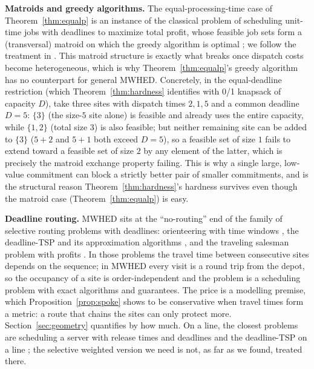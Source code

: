 \documentclass[pdflatex,sn-mathphys-ay]{sn-jnl}
\theoremstyle{thmstyleone}
\theoremstyle{thmstyletwo}
\theoremstyle{thmstylethree}
\begin{document}
\textbf{Matroids and greedy algorithms.} The equal-processing-time case
of Theorem~\ref{thm:equalp} is an instance of the classical problem of
scheduling unit-time jobs with deadlines to maximize total profit, whose
feasible job sets form a (transversal) matroid on which the greedy
algorithm is optimal \citep{edmonds1971}; we follow the treatment in
\citet{kortevygen2018}. This matroid structure is exactly what breaks
once dispatch costs become heterogeneous, which is why
Theorem~\ref{thm:equalp}'s greedy algorithm has no counterpart for
general MWHED. Concretely, in the equal-deadline restriction (which
Theorem~\ref{thm:hardness} identifies with 0/1 knapsack of capacity
$D$), take three sites with dispatch times $2,1,5$ and a common
deadline $D=5$: $\{3\}$ (the size-$5$ site alone) is feasible and
already uses the entire capacity, while $\{1,2\}$ (total size $3$) is
also feasible; but neither remaining site can be added to $\{3\}$ ($5+2$
and $5+1$ both exceed $D=5$), so a feasible set of size $1$ fails to
extend toward a feasible set of size $2$ by any element of the latter,
which is precisely the matroid exchange property failing. This is why a
single large, low-value commitment can block a strictly better pair of
smaller commitments, and is the structural reason
Theorem~\ref{thm:hardness}'s hardness survives even though the matroid
case (Theorem~\ref{thm:equalp}) is easy.

\textbf{Deadline routing.} MWHED sits at the ``no-routing'' end of the
family of selective routing problems with deadlines: orienteering with
time windows \citep{vansteenwegen2011}, the deadline-TSP and its
approximation algorithms \citep{tsitsiklis1992,bansal2004}, and the
traveling salesman problem with profits \citep{feillet2005}. In those
problems the travel time between consecutive sites depends on the
sequence; in MWHED every visit is a round trip from the depot, so the
occupancy of a site is order-independent and the problem is a scheduling
problem with exact algorithms and guarantees. The price is a modelling
premise, which Proposition~\ref{prop:spoke} shows to be conservative when
travel times form a metric: a route that chains the sites
can only protect more. Section~\ref{sec:geometry} quantifies by how much.
On a line, the closest problems are scheduling a server with release times
and deadlines \citep{psaraftis1990,tsitsiklis1992,afrati1986} and the
deadline-TSP on a line \citep{baryehuda2005,farbstein2019}; the selective
weighted version we need is not, as far as we found, treated there.
\end{document}
